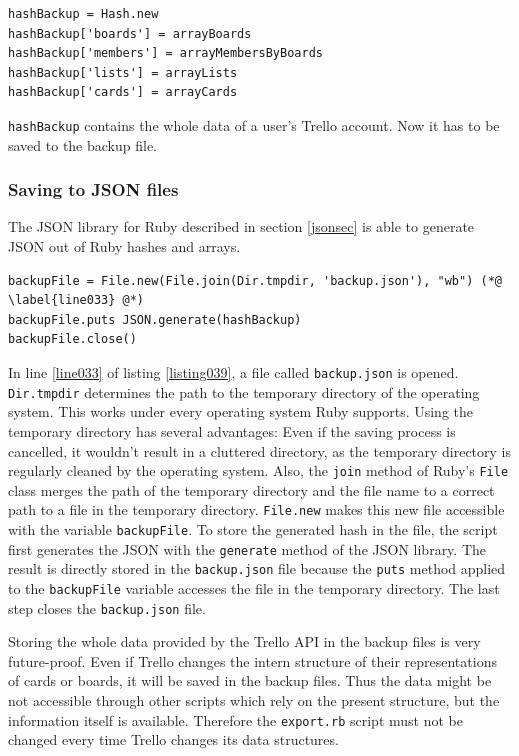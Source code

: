 \begin{lstlisting}[aboveskip=1\baselineskip, caption=\texttt{joomlaMultiple.rb} usage., label=listing038]
hashBackup = Hash.new
hashBackup['boards'] = arrayBoards
hashBackup['members'] = arrayMembersByBoards
hashBackup['lists'] = arrayLists
hashBackup['cards'] = arrayCards
\end{lstlisting}

\lstinline{hashBackup} contains the whole data of a user's Trello account. Now it has to be saved to the backup file. 

\subsubsection{Saving to JSON files}
The JSON library for Ruby described in section \ref{jsonsec} is able to generate JSON out of Ruby hashes and arrays.

\begin{lstlisting}[aboveskip=1\baselineskip, caption=Using the temporary directory of the operating system to save the JSON to file., label=listing039]
backupFile = File.new(File.join(Dir.tmpdir, 'backup.json'), "wb") (*@ \label{line033} @*)
backupFile.puts JSON.generate(hashBackup)
backupFile.close()
\end{lstlisting}

In line \ref{line033} of listing \ref{listing039}, a file called \texttt{backup.json} is opened. \lstinline{Dir.tmpdir} determines the path to the temporary directory of the operating system. This works under every operating system Ruby supports. Using the temporary directory has several advantages: Even if the saving process is cancelled, it wouldn't result in a cluttered directory, as the temporary directory is regularly cleaned by the operating system. Also, the \lstinline{join} method of Ruby's \lstinline{File} class merges the path of the temporary directory and the file name to a correct path to a file in the temporary directory. \lstinline{File.new} makes this new file accessible with the variable \lstinline{backupFile}. To store the generated hash in the file, the script first generates the JSON with the \lstinline{generate} method of the JSON library. The result is directly stored in the \texttt{backup.json} file because the \lstinline{puts} method applied to the \lstinline{backupFile} variable accesses the file in the temporary directory. The last step closes the \texttt{backup.json} file.

Storing the whole data provided by the Trello API in the backup files is very future-proof. Even if Trello changes the intern structure of their representations of cards or boards, it will be saved in the backup files. Thus the data might be not accessible through other scripts which rely on the present structure, but the information itself is available. Therefore the \texttt{export.rb} script must not be changed every time Trello changes its data structures.

